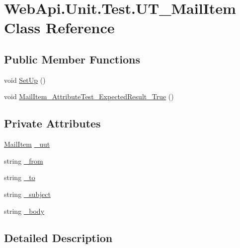 \hypertarget{class_web_api_1_1_unit_1_1_test_1_1_u_t___mail_item}{}\section{Web\+Api.\+Unit.\+Test.\+U\+T\+\_\+\+Mail\+Item Class Reference}
\label{class_web_api_1_1_unit_1_1_test_1_1_u_t___mail_item}
\subsection*{Public Member Functions}
\begin{DoxyCompactItemize}
\item 
void \mbox{\hyperlink{class_web_api_1_1_unit_1_1_test_1_1_u_t___mail_item_a52cd80c9013cde3d5672660214c33c84}{Set\+Up}} ()
\item 
void \mbox{\hyperlink{class_web_api_1_1_unit_1_1_test_1_1_u_t___mail_item_a84d0cdbc43e60240d1bad3410d48a030}{Mail\+Item\+\_\+\+Attribute\+Test\+\_\+\+Expected\+Result\+\_\+\+True}} ()
\end{DoxyCompactItemize}
\subsection*{Private Attributes}
\begin{DoxyCompactItemize}
\item 
\mbox{\hyperlink{class_f_w_p_s_1_1_models_1_1_mail_item}{Mail\+Item}} \mbox{\hyperlink{class_web_api_1_1_unit_1_1_test_1_1_u_t___mail_item_a5cc2b8ae585b1fc9f539aadc7016d88f}{\+\_\+uut}}
\item 
string \mbox{\hyperlink{class_web_api_1_1_unit_1_1_test_1_1_u_t___mail_item_a16c553a48d61178629ae504d518394f1}{\+\_\+from}}
\item 
string \mbox{\hyperlink{class_web_api_1_1_unit_1_1_test_1_1_u_t___mail_item_a02649cd23d602b3bd7f62d85acd7082e}{\+\_\+to}}
\item 
string \mbox{\hyperlink{class_web_api_1_1_unit_1_1_test_1_1_u_t___mail_item_a9a7c10163850b95eb74a447258acdef0}{\+\_\+subject}}
\item 
string \mbox{\hyperlink{class_web_api_1_1_unit_1_1_test_1_1_u_t___mail_item_a1d8e357838676f5229d0b70d6055c3a2}{\+\_\+body}}
\end{DoxyCompactItemize}


\subsection{Detailed Description}


